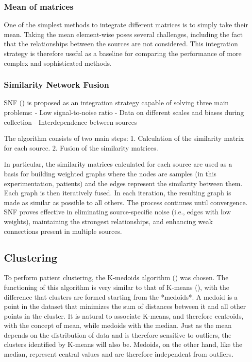 \documentclass[12pt,a4paper]{article}
\begin{document}
\subsubsection{Mean of matrices}
One of the simplest methods to integrate different matrices is to simply take their mean. Taking the mean element-wise poses several challenges, including the fact that the relationships between the sources are not considered. This integration strategy is therefore useful as a baseline for comparing the performance of more complex and sophisticated methods.

\subsubsection{Similarity Network Fusion}
SNF (\cite{Wang2014}) is proposed as an integration strategy capable of solving three main problems:
- Low signal-to-noise ratio
- Data on different scales and biases during collection
- Interdependence between sources

The algorithm consists of two main steps:
1. Calculation of the similarity matrix for each source.
2. Fusion of the similarity matrices.

In particular, the similarity matrices calculated for each source are used as a basis for building weighted graphs where the nodes are samples (in this experimentation, patients) and the edges represent the similarity between them. Each graph is then iteratively fused. In each iteration, the resulting graph is made as similar as possible to all others. The process continues until convergence.
SNF proves effective in eliminating source-specific noise (i.e., edges with low weights), maintaining the strongest relationships, and enhancing weak connections present in multiple sources.

\subsection{Clustering}
To perform patient clustering, the K-medoids algorithm (\cite{Kaufman1990}) was chosen.
The functioning of this algorithm is very similar to that of K-means (\cite{MacQueen1967}), with the difference that clusters are formed starting from the *medoids*.
A medoid is a point in the dataset that minimizes the sum of distances between it and all other points in the cluster.
It is natural to associate K-means, and therefore centroids, with the concept of mean, while medoids with the median.
Just as the mean depends on the distribution of data and is therefore sensitive to outliers, the clusters identified by K-means will also be. Medoids, on the other hand, like the median, represent central values and are therefore independent from outliers.
\end{document}
